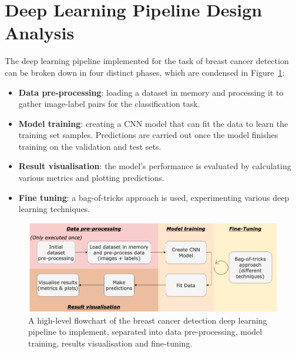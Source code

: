 
\section{Deep Learning Pipeline Design Analysis}

The deep learning pipeline implemented for the task of breast cancer detection can be broken down in four distinct phases, which are condensed in Figure~\ref{fig:design-flowchart}:

\begin{itemize}
    \item \textbf{Data pre-processing}: loading a dataset in memory and processing it to gather image-label pairs for the classification task.
    \item \textbf{Model training}: creating a CNN model that can fit the data to learn the training set samples. Predictions are carried out once the model finishes training on the validation and test sets.
    \item \textbf{Result visualisation}: the model's performance is evaluated by calculating various metrics and plotting predictions.
    \item \textbf{Fine tuning}: a bag-of-tricks approach is used, experimenting various deep learning techniques.
\end{itemize}

\begin{figure}[ht]
\centerline{\includegraphics[width=\textwidth]{figures/design/design flowchart.png}}
\caption{\label{fig:design-flowchart}A high-level flowchart of the breast cancer detection deep learning pipeline to implement, separated into data pre-processing, model training, results visualisation and fine-tuning.}
\end{figure}


